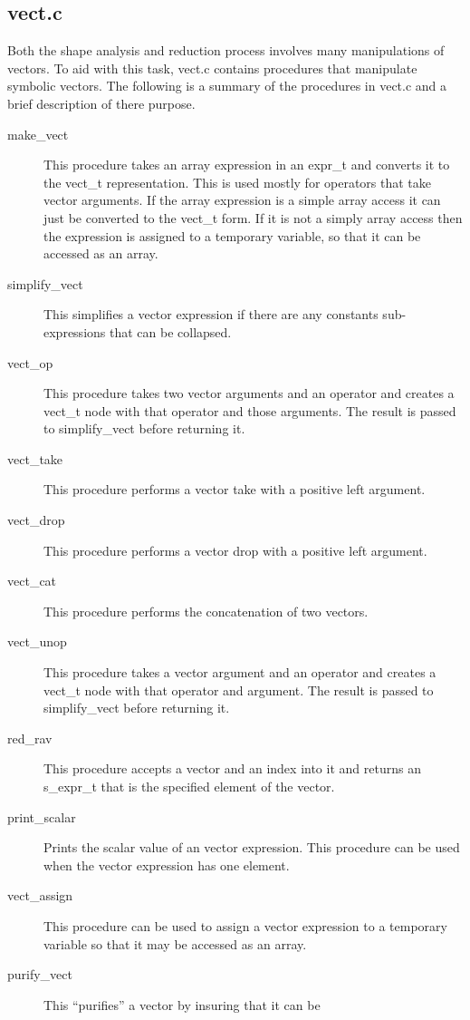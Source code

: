 \subsection{vect.c}
Both the shape analysis and reduction process involves many manipulations
of vectors.  To aid with this task, vect.c contains procedures
that manipulate symbolic vectors.  The following is a summary of the
procedures in vect.c and a brief description of there purpose.
\begin{description}
\item[make\_vect] This procedure takes an array expression in an expr\_t and
converts it to the vect\_t representation.  This is used mostly for operators
that take vector arguments.  If the array expression is a simple array access
it can just be converted to the vect\_t form.  If it is not a simply array
access then the expression is assigned to a temporary variable, so that it
can be accessed as an array.
\item[simplify\_vect]  This simplifies a vector expression if there are
any constants sub-expressions that can be collapsed.
\item[vect\_op]  This procedure takes two vector arguments and an operator
and creates a vect\_t node with that operator and those arguments.  The
result is passed to simplify\_vect before returning it.
\item[vect\_take]  This procedure performs a vector take with a positive 
left argument.
\item[vect\_drop]  This procedure performs a vector drop with a positive 
left argument.
\item[vect\_cat]   This procedure performs the concatenation of two vectors.
\item[vect\_unop]  This procedure takes a vector argument and an operator
and creates a vect\_t node with that operator and argument.  The
result is passed to simplify\_vect before returning it.
\item[red\_rav]  This procedure accepts a vector and an index into it and 
returns an s\_expr\_t that is the specified element of the vector.
\item[print\_scalar]  Prints the scalar value of an vector expression.  This
procedure can be used when the vector expression has one element.
\item[vect\_assign] This procedure can be used to assign a vector expression
to a temporary variable so that it may be accessed as an array.
\item[purify\_vect]  This ``purifies'' a vector by insuring that it can be

\end{description}
